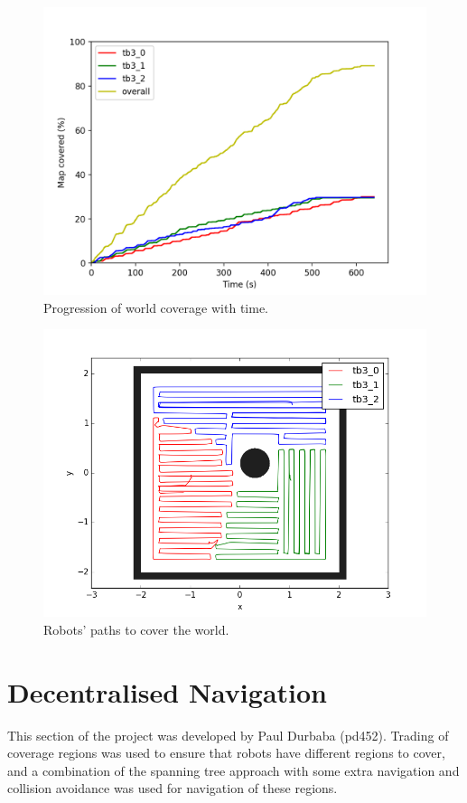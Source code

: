 \documentclass[a4paper, 10pt, conference]{ieeeconf}      %
\begin{document}
\begin{figure}
	\centering
	\includegraphics[width=\columnwidth]{ground_truth.png}
	\caption{Progression of world coverage with time.}
	\label{fig:ground_truth}
\end{figure}

\begin{figure}
	\centering
	\includegraphics[width=\columnwidth]{ground_truth_coverage.png}
	\caption{Robots' paths to cover the world.}
	\label{fig:ground_truth_coverage}
\end{figure}


\section{Decentralised Navigation}
This section of the project was developed by Paul Durbaba (pd452). Trading of coverage regions was used to ensure that robots have different regions to cover, and a combination of the spanning tree approach with some extra navigation and collision avoidance was used for navigation of these regions.
\end{document}
